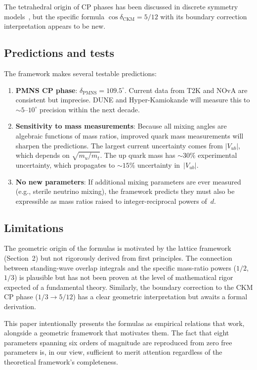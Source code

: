 \documentclass[12pt,a4paper]{article}
\begin{document}
The tetrahedral origin of CP phases has been discussed in discrete symmetry models~\cite{varzielas2012}, but the specific formula $\cos\delta_{\mathrm{CKM}}=5/12$ with its boundary correction interpretation appears to be new.

\subsection{Predictions and tests}

The framework makes several testable predictions:

\begin{enumerate}[nosep]
  \item \textbf{PMNS CP phase}: $\delta_{\mathrm{PMNS}}=109.5^\circ$. Current data from T2K and NOvA are consistent but imprecise. DUNE and Hyper-Kamiokande will measure this to $\sim\!5$--$10^\circ$ precision within the next decade.

  \item \textbf{Sensitivity to mass measurements}: Because all mixing angles are algebraic functions of mass ratios, improved quark mass measurements will sharpen the predictions. The largest current uncertainty comes from $|V_{ub}|$, which depends on $\sqrt{m_u/m_t}$. The up quark mass has $\sim\!30\%$ experimental uncertainty, which propagates to $\sim\!15\%$ uncertainty in~$|V_{ub}|$.

  \item \textbf{No new parameters}: If additional mixing parameters are ever measured (e.g., sterile neutrino mixing), the framework predicts they must also be expressible as mass ratios raised to integer-reciprocal powers of~$d$.
\end{enumerate}

\subsection{Limitations}

The geometric origin of the formulas is motivated by the lattice framework (Section~2) but not rigorously derived from first principles. The connection between standing-wave overlap integrals and the specific mass-ratio powers ($1/2$, $1/3$) is plausible but has not been proven at the level of mathematical rigor expected of a fundamental theory. Similarly, the boundary correction to the CKM CP phase ($1/3\to 5/12$) has a clear geometric interpretation but awaits a formal derivation.

This paper intentionally presents the formulas as empirical relations that work, alongside a geometric framework that motivates them. The fact that eight parameters spanning six orders of magnitude are reproduced from zero free parameters is, in our view, sufficient to merit attention regardless of the theoretical framework's completeness.
\end{document}

